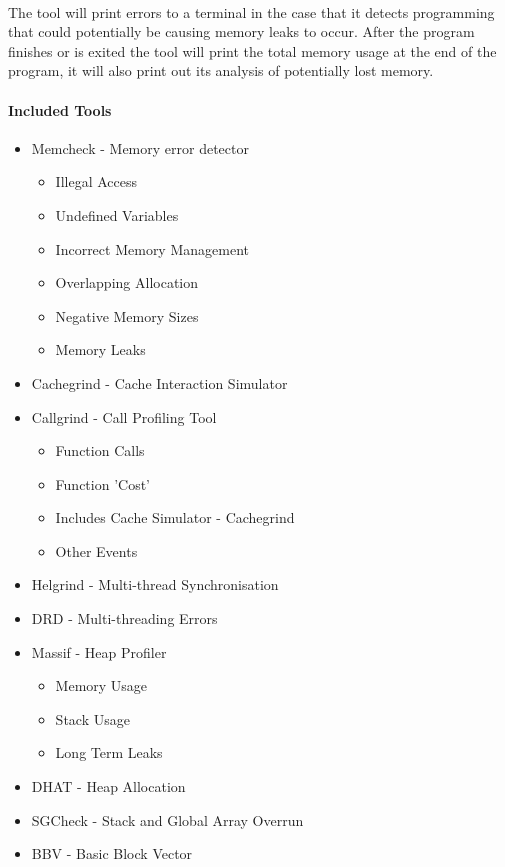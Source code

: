 \paragraph{}
The tool will print errors to a terminal in the case that it detects programming that could potentially be causing memory leaks to occur. After the program finishes or is exited the tool will print the total memory usage at the end of the program, it will also print out its analysis of potentially lost memory.

\paragraph{Included Tools}
\begin{itemize}
\item Memcheck - Memory error detector \footnotemark[1]
  \begin{itemize}
  \item Illegal Access
  \item Undefined Variables
  \item Incorrect Memory Management
  \item Overlapping Allocation
  \item Negative Memory Sizes
  \item Memory Leaks
  \end{itemize}
\item Cachegrind - Cache Interaction Simulator
\item Callgrind - Call Profiling Tool \footnotemark[1]
  \begin{itemize}
  \item Function Calls
  \item Function 'Cost'
  \item Includes Cache Simulator - Cachegrind
  \item Other Events
  \end{itemize}
\item Helgrind - Multi-thread Synchronisation \footnotemark[1]
\item DRD - Multi-threading Errors \footnotemark[1]
\item Massif - Heap Profiler \footnotemark[1]
  \begin{itemize}
  \item Memory Usage
  \item Stack Usage
  \item Long Term Leaks
  \end{itemize}
\item DHAT - Heap Allocation \footnotemark[2]
\item SGCheck - Stack and Global Array Overrun
\item BBV - Basic Block Vector \footnotemark[2]
\end{itemize}

